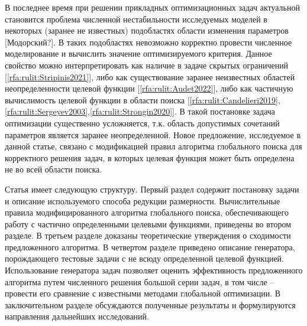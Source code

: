 \documentclass[10pt,a4paper]{book}
\begin{document}
В последнее время при решении прикладных оптимизационных задач актуальной становится проблема численной нестабильности исследуемых моделей в некоторых (заранее не известных) подобластях области изменения параметров [\colorbox[rgb]{1,1,0}{Модорский?}].
В таких подобластях невозможно корректно провести численное моделирование и вычислить значение оптимизируемого критерия.
Данное свойство можно интерпретировать как наличие в задаче скрытых ограничений [\ref{rfa:rulit:Stripinis2021}], либо как существование  заранее неизвестных областей неопределенности целевой функции [\ref{rfa:rulit:Audet2022}], либо как частичную вычислимость целевой функции в области поиска [\ref{rfa:rulit:Candelieri2019},\ref{rfa:rulit:Sergeyev2003},\ref{rfa:rulit:Strongin2020}]. В такой постановке задача оптимизации существенно усложняется, т.к. область допустимых сочетаний параметров является заранее неопределенной. Новое предложение, исследуемое в данной статье, связано с модификацией правил алгоритма глобального поиска для корректного решения задач, в которых целевая функция может быть определена не во всей области поиска.

Статья имеет следующую структуру. Первый раздел содержит постановку задачи и описание используемого способа редукции размерности. Вычислительные правила модифицированного алгоритма глобального поиска, обеспечивающего работу с частично определенными целевыми функциями, приведены во втором разделе. В третьем разделе доказаны теоретические утверждения о сходимости предложенного алгоритма. В четвертом разделе приведено описание генератора, порождающего тестовые задачи с не всюду определенной целевой функцией. Использование генератора задач позволяет оценить эффективность предложенного алгоритма путем численного решения большой серии задач, в том числе -- провести его сравнение с известными методами глобальной оптимизации. В заключительном разделе обсуждаются полученные результаты и формулируются направления дальнейших исследований.
\end{document}
